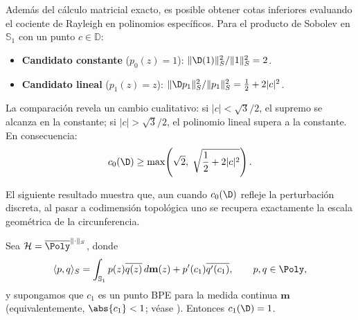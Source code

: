\begin{exm}
	Además del cálculo matricial exacto, es posible obtener cotas inferiores evaluando el cociente de Rayleigh en polinomios específicos. Para el producto de Sobolev en $\mathbb{S}_1$ con un punto $c \in \mathbb{D}$:
	\begin{itemize}
		\item \textbf{Candidato constante} ($p_0(z) = 1$): $\|\D(1)\|_S^2 / \|1\|_S^2 = 2$.
		\item \textbf{Candidato lineal} ($p_1(z) = z$): $\|\D p_1\|_S^2 / \|p_1\|_S^2 = \frac{1}{2} + 2|c|^2$.
	\end{itemize}
	La comparación revela un cambio cualitativo: si $|c| < \sqrt{3}/2$, el supremo se alcanza en la constante; si $|c| > \sqrt{3}/2$, el polinomio lineal supera a la constante. En consecuencia:
	\begin{equation}\label{eq:cota_inferior_c0}
		c_0(\D) \ge \max\!\left(\sqrt{2},\;\sqrt{\frac{1}{2} + 2|c|^2}\right).
	\end{equation}
\end{exm}

El siguiente resultado muestra que, aun cuando $c_0(\D)$ refleje la perturbación discreta, al pasar a codimensión topológica uno se recupera exactamente la escala geométrica de la circunferencia.

\begin{thm}
	\label{thm:c2_punto}
	Sea $\mathcal{H} = \overline{\Poly}^{\|\cdot\|_S}$, donde
	\begin{equation}
		\langle p, q \rangle_S = \int_{\mathbb{S}_1} p(z)\overline{q(z)} \, d\mathbf{m}(z) + p'(c_1)\overline{q'(c_1)}, \qquad p,q \in \Poly,
	\end{equation}
	y supongamos que $c_1$ es un punto BPE para la medida continua $\mathbf m$ (equivalentemente, $\abs{c_1}<1$; véase \cite{duren1970theory}). Entonces $c_1(\D) = 1$.
\end{thm}

